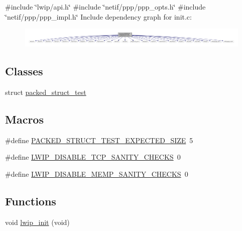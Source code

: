 {\ttfamily \#include \char`\"{}lwip/api.\+h\char`\"{}}\newline
{\ttfamily \#include \char`\"{}netif/ppp/ppp\+\_\+opts.\+h\char`\"{}}\newline
{\ttfamily \#include \char`\"{}netif/ppp/ppp\+\_\+impl.\+h\char`\"{}}\newline
Include dependency graph for init.\+c\+:
\nopagebreak
\begin{figure}[H]
\begin{center}
\leavevmode
\includegraphics[width=350pt]{openmote-cc2538_2lwip_2src_2core_2init_8c__incl}
\end{center}
\end{figure}
\subsection*{Classes}
\begin{DoxyCompactItemize}
\item 
struct \hyperlink{structpacked__struct__test}{packed\+\_\+struct\+\_\+test}
\end{DoxyCompactItemize}
\subsection*{Macros}
\begin{DoxyCompactItemize}
\item 
\#define \hyperlink{openmote-cc2538_2lwip_2src_2core_2init_8c_afa3b6d3e87614ea5ab1aa9e7ac00cda4}{P\+A\+C\+K\+E\+D\+\_\+\+S\+T\+R\+U\+C\+T\+\_\+\+T\+E\+S\+T\+\_\+\+E\+X\+P\+E\+C\+T\+E\+D\+\_\+\+S\+I\+ZE}~5
\item 
\#define \hyperlink{openmote-cc2538_2lwip_2src_2core_2init_8c_a2fd90dfd6cee216d4a316078cc0ec2b9}{L\+W\+I\+P\+\_\+\+D\+I\+S\+A\+B\+L\+E\+\_\+\+T\+C\+P\+\_\+\+S\+A\+N\+I\+T\+Y\+\_\+\+C\+H\+E\+C\+KS}~0
\item 
\#define \hyperlink{openmote-cc2538_2lwip_2src_2core_2init_8c_ad76cb551defb63d2352d696afcb8ade6}{L\+W\+I\+P\+\_\+\+D\+I\+S\+A\+B\+L\+E\+\_\+\+M\+E\+M\+P\+\_\+\+S\+A\+N\+I\+T\+Y\+\_\+\+C\+H\+E\+C\+KS}~0
\end{DoxyCompactItemize}
\subsection*{Functions}
\begin{DoxyCompactItemize}
\item 
void \hyperlink{group__lwip__nosys_ga0c1a18439524d2f4a5e51d25c0ca2ce9}{lwip\+\_\+init} (void)
\end{DoxyCompactItemize}
